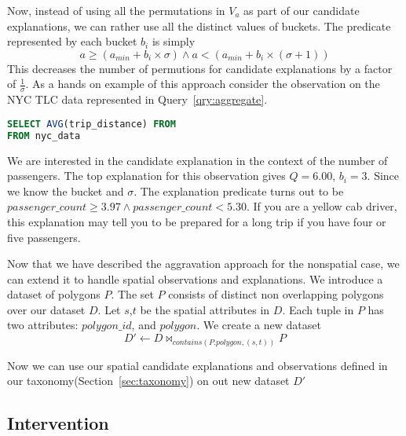 Now, instead of using all the permutations in $V_a$ as part of our candidate explanations, we can rather use all the distinct values of buckets. The predicate represented by each bucket $b_i$ is simply
$$ a \geq (a_{min}+b_i\times\sigma) \wedge a < (a_{min}+b_i\times(\sigma+1))$$
This decreases the number of permutions for candidate explanations by a factor of $\frac{1}{\sigma}$. As a hands on example of this approach consider the observation on the NYC TLC data represented in Query~\ref{qry:aggregate}.

\renewcommand{\lstlistingname}{Query}%
\begin{lstlisting}[language=SQL, caption=Aggregate Query for average tip percentage, label=qry:aggregate]
SELECT AVG(trip_distance) FROM
FROM nyc_data
\end{lstlisting}

We are interested in the candidate explanation in the context of the number of passengers. The top explanation for this observation gives $Q=6.00$, $b_i=3$. Since we know the bucket and $\sigma$. The explanation predicate turns out to be $passenger\_count \geq 3.97 \wedge passenger\_count < 5.30$. If you are a yellow cab driver, this explanation may tell you to be prepared for a long trip if you have four or five passengers.

Now that we have described the aggravation approach for the nonspatial case, we can extend it to handle spatial observations and explanations. We introduce a dataset of polygons $P$. The set $P$ consists of distinct non overlapping polygons over our dataset $D$. Let $s$,$t$ be the spatial attributes in $D$. Each tuple in $P$ has two attributes: $polygon\_id$, and $polygon$. We create a new dataset
$$D' \leftarrow D \bowtie_{contains(P.polygon,(s,t))} P$$

Now we can use our spatial candidate explanations and observations defined in our taxonomy(Section~\ref{sec:taxonomy}) on out new dataset $D'$

\subsection{Intervention}
\label{sec:intervention}

